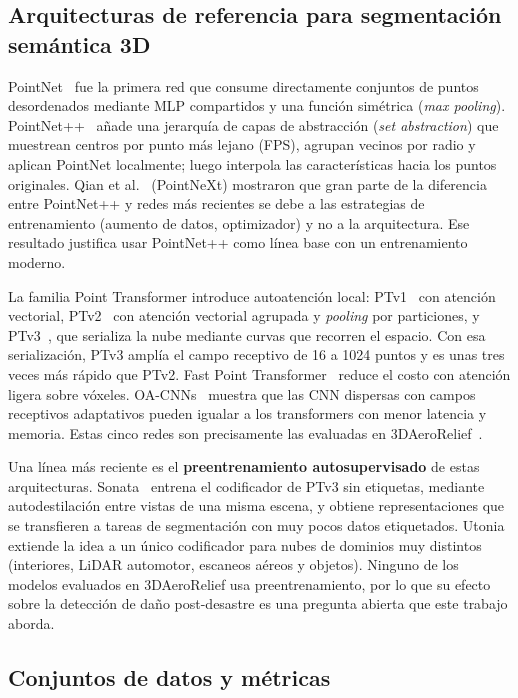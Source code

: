 \documentclass[5p]{elsarticle}
\begin{document}
\subsection{Arquitecturas de referencia para segmentación semántica 3D}

PointNet~\cite{Qi2017a} fue la primera red que consume directamente conjuntos de puntos desordenados mediante MLP compartidos y una función simétrica (\emph{max pooling}). PointNet++~\cite{Qi2017b} añade una jerarquía de capas de abstracción (\emph{set abstraction}) que muestrean centros por punto más lejano (FPS), agrupan vecinos por radio y aplican PointNet localmente; luego interpola las características hacia los puntos originales. Qian et al.~\cite{Qian2022} (PointNeXt) mostraron que gran parte de la diferencia entre PointNet++ y redes más recientes se debe a las estrategias de entrenamiento (aumento de datos, optimizador) y no a la arquitectura. Ese resultado justifica usar PointNet++ como línea base con un entrenamiento moderno.

La familia Point Transformer introduce autoatención local: PTv1~\cite{Zhao2021} con atención vectorial, PTv2~\cite{Wu2022} con atención vectorial agrupada y \emph{pooling} por particiones, y PTv3~\cite{Wu2024}, que serializa la nube mediante curvas que recorren el espacio. Con esa serialización, PTv3 amplía el campo receptivo de 16 a 1024 puntos y es unas tres veces más rápido que PTv2. Fast Point Transformer~\cite{Park2022} reduce el costo con atención ligera sobre vóxeles. OA-CNNs~\cite{Peng2024} muestra que las CNN dispersas con campos receptivos adaptativos pueden igualar a los transformers con menor latencia y memoria. Estas cinco redes son precisamente las evaluadas en 3DAeroRelief~\cite{Le2026}.

Una línea más reciente es el \textbf{preentrenamiento autosupervisado} de estas arquitecturas. Sonata~\cite{Wu2025} entrena el codificador de PTv3 sin etiquetas, mediante autodestilación entre vistas de una misma escena, y obtiene representaciones que se transfieren a tareas de segmentación con muy pocos datos etiquetados. Utonia~\cite{Zhang2026} extiende la idea a un único codificador para nubes de dominios muy distintos (interiores, LiDAR automotor, escaneos aéreos y objetos). Ninguno de los modelos evaluados en 3DAeroRelief usa preentrenamiento, por lo que su efecto sobre la detección de daño post-desastre es una pregunta abierta que este trabajo aborda.

\subsection{Conjuntos de datos y métricas}
\end{document}
